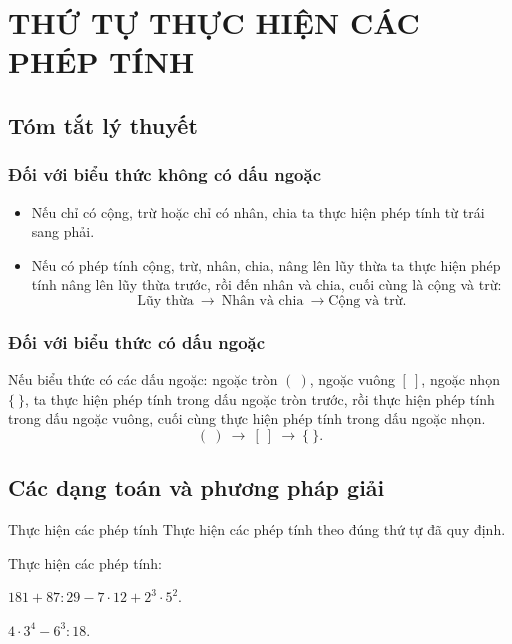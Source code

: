 \section{THỨ TỰ THỰC HIỆN CÁC PHÉP TÍNH}
\subsection{Tóm tắt lý thuyết}
\subsubsection{Đối với biểu thức không có dấu ngoặc}
\begin{itemize}
	\item Nếu chỉ có cộng, trừ hoặc chỉ có nhân, chia ta thực hiện phép tính từ trái sang phải.
	\item Nếu có phép tính cộng, trừ, nhân, chia, nâng lên lũy thừa ta thực hiện phép tính nâng lên lũy thừa trước, rồi đến nhân và chia, cuối cùng là cộng và trừ: $$\text{Lũy thừa}\ \rightarrow\ \text{Nhân và chia}\ \rightarrow \text{Cộng và trừ}.$$
\end{itemize}
\subsubsection{Đối với biểu thức có dấu ngoặc}
Nếu biểu thức có các dấu ngoặc: ngoặc tròn $(\ )$, ngoặc vuông $[\ ]$, ngoặc nhọn $\{\ \}$, ta thực hiện phép tính trong dấu ngoặc tròn trước, rồi thực hiện phép tính trong dấu ngoặc vuông, cuối cùng thực hiện phép tính trong dấu ngoặc nhọn. $$(\ )\ \rightarrow\ [\ ]\ \rightarrow\ \{\ \}.$$
\subsection{Các dạng toán và phương pháp giải}

\begin{dang}{Thực hiện các phép tính}
	Thực hiện các phép tính theo đúng thứ tự đã quy định.
\end{dang}

\begin{vd}%
	Thực hiện các phép tính:
	\begin{enumEX}{1}
		\item $181+87:29-7\cdot12+2^3\cdot5^2$.
		\item $4\cdot 3^4-6^3:18$.
	\end{enumEX}
\end{vd}


